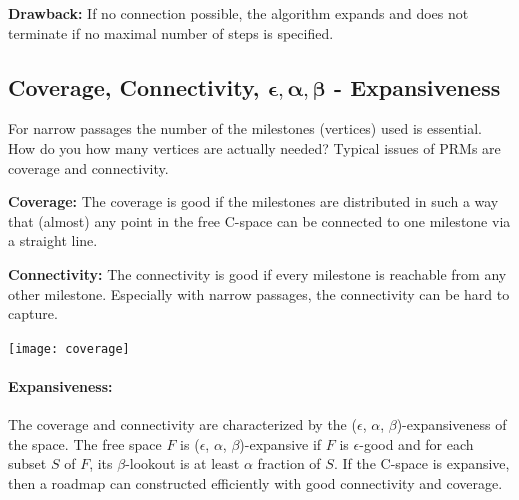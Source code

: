 \begin{multicols*}{2}
\textbf{Drawback:} If no connection possible, the algorithm expands and does not terminate if no maximal number of steps is specified.

\subsection{Coverage, Connectivity, $\mathbold{\epsilon, \alpha, \beta}$ - Expansiveness}
For narrow passages the number of the milestones (vertices) used is essential.
How do you how many vertices are actually needed?
Typical issues of PRMs are coverage and connectivity.\par

\textbf{Coverage:} The coverage is good if the milestones are distributed in such a way that (almost) any point in the free C-space can be connected to one milestone via a straight line.\par

\textbf{Connectivity:} The connectivity is good if every milestone is reachable from any other milestone. Especially with narrow passages, the connectivity can be hard to capture.

\begin{center}
	\texttt{[image: coverage]}
\end{center}

\paragraph{Expansiveness:}
The coverage and connectivity are characterized by the ($\epsilon$, $\alpha$, $\beta$)-expansiveness of the space.
The free space $F$ is ($\epsilon$, $\alpha$, $\beta$)-expansive if $F$ is $\epsilon$-good and for each subset $S$ of $F$, its $\beta$-lookout is at least $\alpha$ fraction of $S$.
If the C-space is expansive, then a roadmap can constructed efficiently with good connectivity and coverage.


\end{multicols*}

